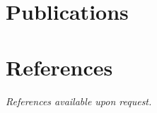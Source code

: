 \documentclass[showupdate]{xqcv}
\begin{document}
\section{Publications}

\section{References}
\textit{References available upon request.}
\end{document}
